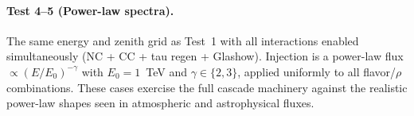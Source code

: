 \paragraph{Test 4--5 (Power-law spectra).} The same energy and zenith
grid as Test~1 with all interactions enabled simultaneously
(NC + CC + tau regen + Glashow). Injection is a power-law flux
$\propto (E/E_0)^{-\gamma}$ with $E_0 = 1$~TeV and $\gamma \in \{2, 3\}$,
applied uniformly to all flavor/$\rho$ combinations. These cases
exercise the full cascade machinery against the realistic
power-law shapes seen in atmospheric and astrophysical fluxes.

